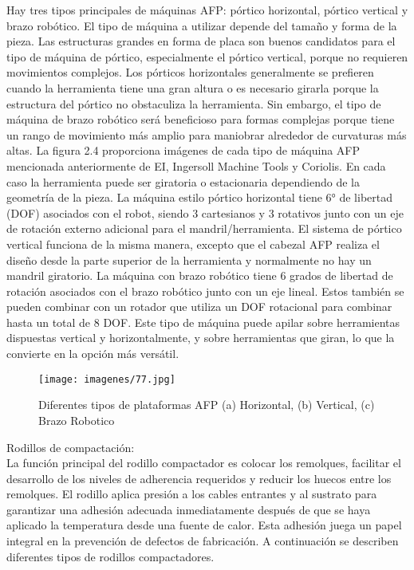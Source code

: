 Hay tres tipos principales de máquinas AFP: pórtico horizontal, pórtico vertical y brazo robótico. El tipo de máquina a utilizar depende del tamaño y forma de la pieza. Las estructuras grandes en forma de placa son buenos candidatos para el tipo de máquina de pórtico, especialmente el pórtico vertical, porque no requieren movimientos complejos. Los pórticos horizontales generalmente se prefieren cuando la herramienta tiene una gran altura o es necesario girarla porque la estructura del pórtico no obstaculiza la herramienta. Sin embargo, el tipo de máquina de brazo robótico será beneficioso para formas complejas porque tiene un rango de movimiento más amplio para maniobrar alrededor de curvaturas más altas.
La figura 2.4 proporciona imágenes de cada tipo de máquina AFP mencionada anteriormente de EI, Ingersoll Machine Tools y Coriolis. En cada caso la herramienta puede ser giratoria o estacionaria dependiendo de la geometría de la pieza. La máquina estilo pórtico horizontal tiene 6° de libertad (DOF) asociados con el robot, siendo 3 cartesianos y 3 rotativos junto con un eje de rotación externo adicional para el mandril/herramienta. El sistema de pórtico vertical funciona de la misma manera, excepto que el cabezal AFP realiza el diseño desde la parte superior de la herramienta y normalmente no hay un mandril giratorio. La máquina con brazo robótico tiene 6 grados de libertad de rotación asociados con el brazo robótico junto con un eje lineal. Estos también se pueden combinar con un rotador que utiliza un DOF rotacional para combinar hasta un total de 8 DOF. Este tipo de máquina puede apilar sobre herramientas dispuestas vertical y horizontalmente, y sobre herramientas que giran, lo que la convierte en la opción más versátil.
 \begin{figure}[H]
\begin{center}
\texttt{[image: imagenes/77.jpg]}
\caption{Diferentes tipos de plataformas AFP (a) Horizontal, (b) Vertical, (c) Brazo Robotico}
\label{afp}
\end{center}
\end{figure}
Rodillos de compactación:\\
La función principal del rodillo compactador es colocar los remolques, facilitar el desarrollo de los niveles de adherencia requeridos y reducir los huecos entre los remolques. El rodillo aplica presión a los cables entrantes y al sustrato para garantizar una adhesión adecuada inmediatamente después de que se haya aplicado la temperatura desde una fuente de calor. Esta adhesión juega un papel integral en la prevención de defectos de fabricación. A continuación se describen diferentes tipos de rodillos compactadores.\\\\
